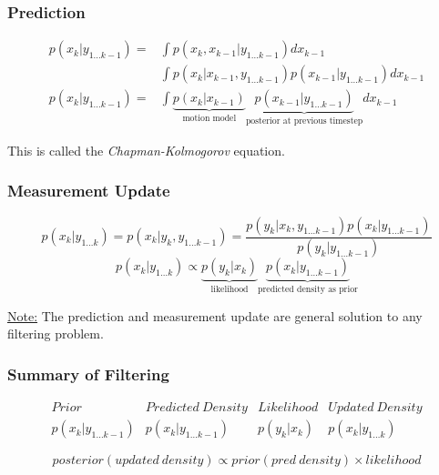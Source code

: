 \subsubsection{Prediction}

\begin{align}
    p(x_k|y_{1\dots k-1}) = &  \int p(x_k, x_{k-1} | y_{1\dots k-1}) dx_{k-1} \\
     & \int p(x_k | x_{k-1}, y_{1\dots k-1}) p(x_{k-1} | y_{1\dots k-1}) dx_{k-1} \\
    p(x_k|y_{1\dots k-1}) =  & \int \underbrace{p(x_k | x_{k-1})}_\text{motion model} \underbrace{p(x_{k-1} | y_{1 \dots k-1})}_\text{posterior at previous timestep} dx_{k-1}
\end{align}


This is called the \textit{Chapman-Kolmogorov} equation.
\subsubsection{Measurement Update}
\begin{equation}
    p(x_k|y_{1\dots k}) = p(x_k | y_k, y_{1\dots k-1}) = \frac{p(y_k | x_k, y_{1\dots k-1}) p(x_k | y_{1\dots k-1})}{p(y_k | y_{1\dots k-1})}
\end{equation}
\begin{equation}
    p(x_k| y_{1\dots k}) \propto \underbrace{p(y_k | x_k)}_\text{likelihood} \underbrace{p(x_k | y_{1\dots k-1})}_\text{predicted density as prior}
\end{equation}

\underline{Note:} The prediction and measurement update are general solution to any filtering problem.

\subsubsection{Summary of Filtering}
\begin{equation}
\begin{array}{cccc}
    Prior & Predicted \: Density & Likelihood & Updated \: Density \\
    p(x_k|y_{1\dots k-1}) & p(x_k|y_{1\dots k-1}) & p(y_k | x_k) & p(x_k|y_{1\dots k})
\end{array}
\end{equation}

\begin{equation}
    posterior(updated\:density) \propto prior(pred\:density) \times likelihood
\end{equation}

